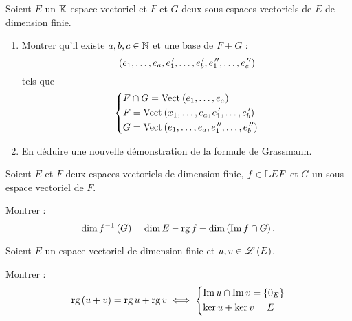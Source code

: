 \begin{corr}
\end{corr}

\begin{exo}
Soient \(E\) un \(\mathbb{K}\)-espace vectoriel et \(F\) et \(G\) deux sous-espaces vectoriels de \(E\) de dimension finie.

\begin{enumerate}
\item Montrer qu'il existe \(a,b,c\in\mathbb{N}\) et une base de \(F+G\) : \[\left(e_1,\dots,e_a,e_1^{\,\prime},\dots,e_b^{\,\prime},e_1^{\,\prime\prime},\dots,e_c^{\,\prime\prime}\right)\] tels que \[\begin{dcases}
F\inter G=\Vect{e_1,\dots,e_a} \\
F=\Vect{x_1,\dots,e_a,e_1\prim,\dots,e_b\prim} \\
G=\Vect{e_1,\dots,e_a,e_1\seconde,\dots,e_b\seconde}
\end{dcases}\]

\item En déduire une nouvelle démonstration de la formule de Grassmann.
\end{enumerate}
\end{exo}

\begin{corr}
\end{corr}

\begin{exo}
Soient \(E\) et \(F\) deux espaces vectoriels de dimension finie, \(f\in\mathbb{L}{E}{F}\) et \(G\) un sous-espace vectoriel de \(F\).

Montrer : \[\dim f^{-1}\left(G\right)=\dim E-\operatorname{rg} f+\dim\left(\operatorname{Im} f\cap G\right).\]
\end{exo}

\begin{corr}
\end{corr}

\begin{exo}[Exercice 14]
Soient \(E\) un espace vectoriel de dimension finie et \(u,v\in\mathscr{L}\left(E\right)\).

Montrer : \[\operatorname{rg}\left(u+v\right)=\operatorname{rg} u+\operatorname{rg} v\iff\begin{dcases}
\operatorname{Im} u\cap\operatorname{Im} v=\left\lbrace0_E\right\rbrace \\
\ker u+\ker v=E
\end{dcases}\]
\end{exo}

\begin{corr}
\end{corr}

